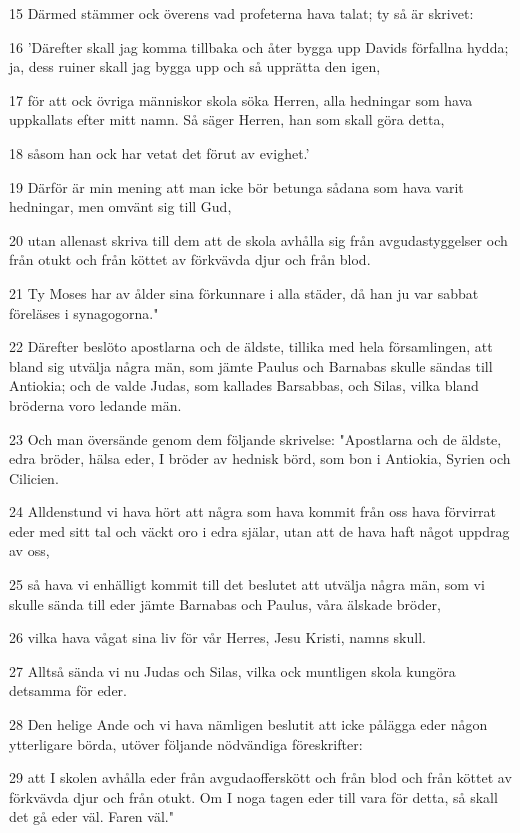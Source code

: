 \par 15 Därmed stämmer ock överens vad profeterna hava talat; ty så är skrivet:
\par 16 'Därefter skall jag komma tillbaka och åter bygga upp Davids förfallna hydda; ja, dess ruiner skall jag bygga upp och så upprätta den igen,
\par 17 för att ock övriga människor skola söka Herren, alla hedningar som hava uppkallats efter mitt namn. Så säger Herren, han som skall göra detta,
\par 18 såsom han ock har vetat det förut av evighet.'
\par 19 Därför är min mening att man icke bör betunga sådana som hava varit hedningar, men omvänt sig till Gud,
\par 20 utan allenast skriva till dem att de skola avhålla sig från avgudastyggelser och från otukt och från köttet av förkvävda djur och från blod.
\par 21 Ty Moses har av ålder sina förkunnare i alla städer, då han ju var sabbat föreläses i synagogorna."
\par 22 Därefter beslöto apostlarna och de äldste, tillika med hela församlingen, att bland sig utvälja några män, som jämte Paulus och Barnabas skulle sändas till Antiokia; och de valde Judas, som kallades Barsabbas, och Silas, vilka bland bröderna voro ledande män.
\par 23 Och man översände genom dem följande skrivelse: "Apostlarna och de äldste, edra bröder, hälsa eder, I bröder av hednisk börd, som bon i Antiokia, Syrien och Cilicien.
\par 24 Alldenstund vi hava hört att några som hava kommit från oss hava förvirrat eder med sitt tal och väckt oro i edra själar, utan att de hava haft något uppdrag av oss,
\par 25 så hava vi enhälligt kommit till det beslutet att utvälja några män, som vi skulle sända till eder jämte Barnabas och Paulus, våra älskade bröder,
\par 26 vilka hava vågat sina liv för vår Herres, Jesu Kristi, namns skull.
\par 27 Alltså sända vi nu Judas och Silas, vilka ock muntligen skola kungöra detsamma för eder.
\par 28 Den helige Ande och vi hava nämligen beslutit att icke pålägga eder någon ytterligare börda, utöver följande nödvändiga föreskrifter:
\par 29 att I skolen avhålla eder från avgudaofferskött och från blod och från köttet av förkvävda djur och från otukt. Om I noga tagen eder till vara för detta, så skall det gå eder väl. Faren väl."

